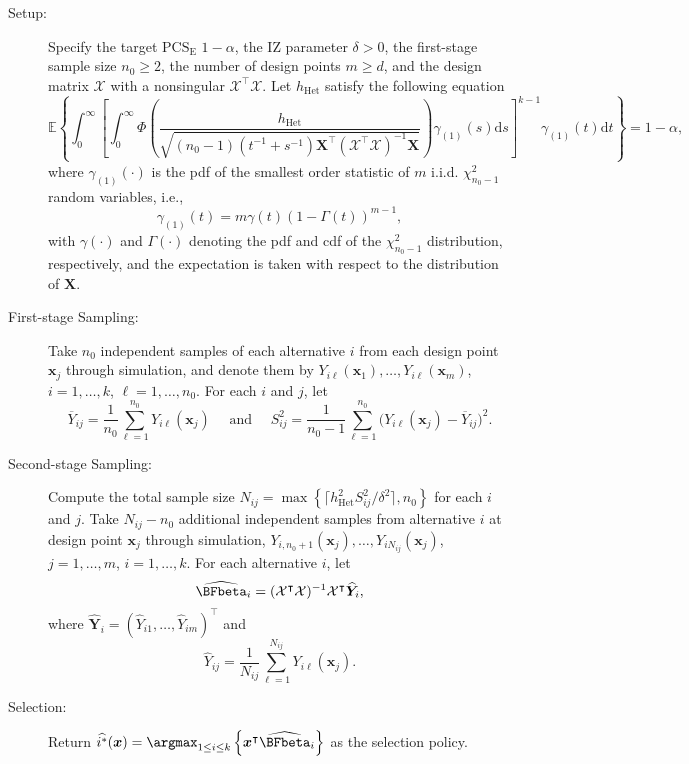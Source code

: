 \documentclass[ijoc,nonblindrev]{informs3}
\def\E{\mathbb{E}}
\def\ud{\mathrm{d}}
\def\bx{{\bm x}}
\def\bX{{\bm X}}
\def\bY{{\bm Y}}
\def\cX{{\mathcal X}}
\def\PCSE{\mathrm{PCS}_{\mathrm{E}}}
\def\hhet{h_{\mathrm{Het}}}
\begin{document}
\begin{procedure}[Procedure TS$^+$]
\item[]
\begin{description}
\item[Setup:]
Specify the target $\PCSE$ $1-\alpha$, the IZ parameter $\delta > 0$, the first-stage sample size $n_0\geq 2$, the number of design points $m\geq d$, and the design matrix $\mathcal{X}$ with a nonsingular $\cX^\intercal \cX$. Let $\hhet$ satisfy the following equation
\begin{equation} \label{eq-geth2}
\E \left\{ \int_0^\infty \left[ \int_0^\infty \Phi \left(  \frac{\hhet}{\sqrt{ (n_0-1) (t^{-1}+s^{-1})\bX^\intercal (\cX^\intercal \cX)^{-1} \bX }} \right) \gamma_{(1)}(s) \ud s \right]^{k-1} \gamma_{(1)}(t) \ud t \right\} = 1-\alpha,
\end{equation}
where $\gamma_{(1)}(\cdot)$ is the pdf of the smallest order statistic of $m$ i.i.d. $\chi_{n_0-1}^2$ random variables,  i.e.,
\begin{equation*} \label{eq-minf}
\gamma_{(1)}(t) = m \gamma(t) (1-\Gamma(t))^{m-1},
\end{equation*}
with $\gamma(\cdot)$ and $\Gamma(\cdot)$ denoting the pdf and cdf of the $\chi_{n_0-1}^2$ distribution, respectively, and the expectation is taken with respect to the distribution of $\bX$.

\item[First-stage Sampling:]
Take $n_0$ independent samples of each alternative $i$ from each design point $\bx_j$ through simulation, and denote them by $Y_{i\ell}(\bx_1),\ldots,Y_{i\ell}(\bx_m)$, $i=1,\ldots,k$, $\ell = 1,\ldots,n_0$.
For each $i$ and $j$, let
\[
\overline{Y}_{ij} =\frac{1}{n_0} \sum_{\ell=1}^{n_0} Y_{i\ell}(\bx_j)\quad \text{ and } \quad
S_{ij}^2 = \frac{1}{n_0-1} \sum_{\ell=1}^{n_0} \Big(Y_{i\ell}(\bx_j) - \overline{Y}_{ij} \Big)^2.
\]

\item[Second-stage Sampling:]
Compute the total sample size $N_{ij} = \max \left\{\lceil \hhet^2 S_{ij}^2/\delta^2\rceil, n_0 \right\}$ for each $i$ and $j$.
Take $N_{ij}-n_0$ additional independent samples from alternative $i$ at design point $\bx_j$ through simulation, $Y_{i,n_0+1}(\bx_j), \ldots, Y_{iN_{ij}}(\bx_j)$, $j=1,\ldots,m$, $i=1,\ldots,k$.
For each alternative $i$, let
\[\widehat{\BFbeta}_i = (\cX^\intercal \cX)^{-1} \cX^\intercal \widehat{\bY}_i,\]
where $\widehat{\bY}_i = (\widehat{Y}_{i1}, \ldots, \widehat{Y}_{im})^\intercal$ and
\[ \widehat{Y}_{ij} =\frac{1}{N_{ij}} \sum_{\ell=1}^{N_{ij}} Y_{i\ell}(\bx_j).\]

\item[Selection:]
Return $\widehat{i^*}(\bx) = \argmax_{1\leq i\leq k} \left\{  \bx^\intercal \widehat{\BFbeta}_i \right\}$ as the selection policy.

\end{description}
\end{procedure}
\end{document}
